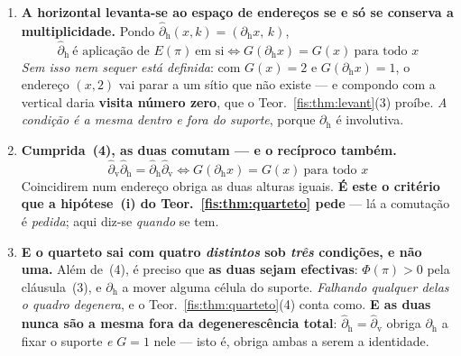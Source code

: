 \documentclass[livro.tex]{subfiles}
\begin{document}
\begin{teorema}
\begin{enumerate}
\item[(4)] \textbf{A horizontal levanta-se ao espaço de endereços se e só se
conserva a multiplicidade.} Pondo
$\hat\partial_{\mathrm{h}}(x,k)=(\partial_{\mathrm{h}}x,\,k)$,
\[
\boxed{\;\hat\partial_{\mathrm{h}}\ \text{é aplicação de }E(\pi)\ \text{em si}
\iff G(\partial_{\mathrm{h}}x)=G(x)\ \text{para todo }x\;}
\]
\emph{Sem isso nem sequer está definida}: com $G(x)=2$ e $G(\partial_{\mathrm h}x)=1$,
o endereço $(x,2)$ vai parar a um sítio que não existe --- e compondo com a
vertical daria \textbf{visita número zero}, que o
Teor.~\ref{fis:thm:levant}(3) proíbe. \emph{A condição é a mesma dentro e fora do
suporte}, porque $\partial_{\mathrm h}$ é involutiva.
\item[(5)] \textbf{Cumprida~(4), as duas comutam --- e o recíproco também.}
\[
\boxed{\;\hat\partial_{\mathrm{v}}\hat\partial_{\mathrm{h}}
=\hat\partial_{\mathrm{h}}\hat\partial_{\mathrm{v}}
\iff G(\partial_{\mathrm{h}}x)=G(x)\ \text{para todo }x\;}
\]
Coincidirem num endereço obriga as duas alturas iguais.
\textbf{É este o critério que a hipótese~(i) do
Teor.~\ref{fis:thm:quarteto} pede} --- lá a comutação é \emph{pedida}; aqui
diz-se \emph{quando} se tem.
\item[(6)] \textbf{E o quarteto sai com quatro \emph{distintos} sob \emph{três}
condições, e não uma.} Além de~(4), é preciso que \textbf{as duas sejam
efectivas}: $\Phi(\pi)>0$ pela cláusula~(3), e $\partial_{\mathrm{h}}$ a mover
alguma célula do suporte. \emph{Falhando qualquer delas o quadro degenera}, e o
Teor.~\ref{fis:thm:quarteto}(4) conta como. \textbf{E as duas nunca são a mesma
fora da degenerescência total}: $\hat\partial_{\mathrm{h}}=\hat\partial_{\mathrm{v}}$
obriga $\partial_{\mathrm h}$ a fixar o suporte \emph{e} $G=1$ nele --- isto
é, obriga ambas a serem a identidade.
\end{enumerate}
\end{teorema}
\end{document}
